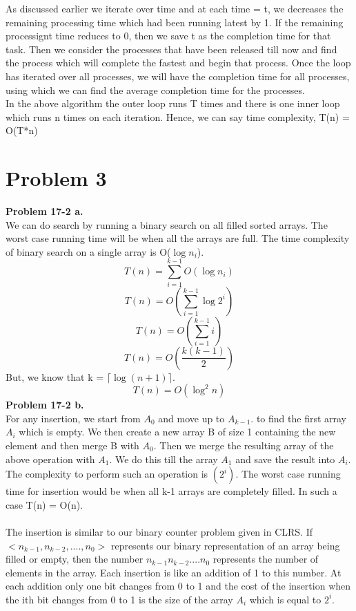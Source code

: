 \documentclass[10pt]{article}
\begin{document}
As discussed earlier we iterate over time and at each time = t, we decreases the remaining processing time which had been running latest by 1. If the remaining processignt time reduces to 0, then we save t as the completion time for that task. Then we consider the processes that have been released till now and find the process which will complete the fastest and begin that process. Once the loop has iterated over all processes, we will have the completion time for all processes, using which we can find the average completion time for the processes.\\
In the above algorithm the outer loop runs T times and there is one inner loop which runs n times on each iteration. Hence, we can say time complexity, T(n) = O(T*n)
\newpage
\section{Problem 3}
\textbf{Problem 17-2 a.}\\
We can do search by running a binary search on all filled sorted arrays. The worst case running time will be when all the arrays are full. The time complexity of binary search on a single array is O($\log n_i$).
$$T(n) = \sum_{i=1}^{k-1} O(\log n_i)$$
$$T(n) = O(\sum_{i=1}^{k-1} \log 2^i)$$
$$T(n) = O(\sum_{i=1}^{k-1} i)$$
$$T(n) = O(\dfrac{k(k-1)}{2})$$
But, we know that k = $\lceil \log (n+1) \rceil$.
$$ T(n) = O(\log^2 n)$$
\textbf{Problem 17-2 b.}\\
For any insertion, we start from $A_0$ and move up to $A_{k-1}$. to find the first array $A_i$ which is empty. We then create a new array B of size 1 containing the new element and then merge B with $A_0$. Then we merge the resulting array of the above operation with $A_1$. We do this till the array $A_1$ and save the result into $A_i$. The complexity to perform such an operation is $(2^i)$. The worst case running time for insertion would be when all k-1 arrays are completely filled. In such a case T(n) = O(n).\\\\
The insertion is similar to our binary counter problem given in CLRS. If $<n_{k-1}, n_{k-2}, .... , n_0>$ represents our binary representation of an array being filled or empty, then the number $n_{k-1}n_{k-2}....n_0$ represents the number of elements in the array. Each insertion is like an addition of 1 to this number. At each addition only one bit changes from 0 to 1 and the cost of the insertion when the ith bit changes from 0 to 1 is the size of the array $A_i$ which is equal to $2^i$.\\
\end{document}
